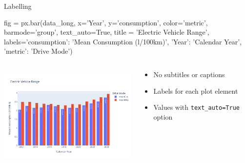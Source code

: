 \documentclass[ignorenonframetext,xcolor=x11names]{beamer}
\begin{document}
\begin{frame}[fragile]{Labelling}
\begin{pythoncode}
fig = px.bar(data_long,
  x='Year', y='consumption', color='metric', barmode='group',
  text_auto=True,
  title = 'Electric Vehicle Range',
  labels={'consumption': 'Mean Consumption (l/100km)', 
          'Year': 'Calendar Year', 
          'metric': 'Drive Mode'})
\end{pythoncode}
\begin{columns}
\begin{column}{.65\textwidth}
\includegraphics[height=2in]{px.fuel.columns.labels.pdf}
\end{column}
\begin{column}{.35\textwidth}
\footnotesize
  \begin{itemize}
  \item No subtitles or captions
  \item Labels for each plot element
  \item Values with \texttt{text\_auto=True} option
  \end{itemize}
\end{column}
\end{columns}
\end{frame}
\end{document}
